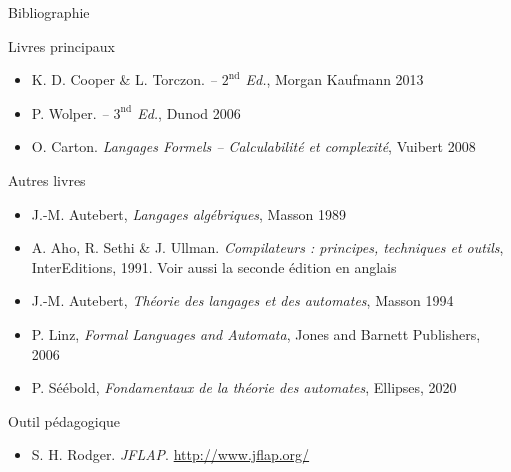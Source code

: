 
\begingroup

\begin{frame}{Bibliographie}
  
  \begin{block}{Livres principaux}\footnotesize
    \begin{itemize}
    \item K. D. Cooper \& L. Torczon. \textit{ -- $2^\text{nd}$ Ed.}, Morgan Kaufmann 2013
    \item P. Wolper. \textit{ -- $3^\text{nd}$ Ed.}, Dunod 2006
    \item O. Carton. \textit{Langages Formels -- Calculabilité et complexité}, Vuibert 2008
    \end{itemize}
  \end{block}

  \begin{block}{Autres livres}\footnotesize
    \begin{itemize}
    \item J.-M. Autebert, \textit{Langages algébriques}, Masson 1989
    \item A. Aho, R. Sethi \& J. Ullman. \textit{Compilateurs : principes, techniques et outils}, InterEditions, 1991. Voir aussi la seconde édition en anglais
    \item J.-M. Autebert, \textit{Théorie des langages et des automates}, Masson 1994
    \item P. Linz, \textit{Formal Languages and Automata}, Jones and Barnett Publishers, 2006
    \item P. Séébold, \textit{Fondamentaux de la théorie des automates}, Ellipses, 2020
    \end{itemize}
  \end{block}

  \begin{block}{Outil pédagogique}\footnotesize
    \begin{itemize}
    \item S. H. Rodger. \textit{JFLAP}. \url{http://www.jflap.org/} 
    \end{itemize}
  \end{block}

\end{frame}

\endgroup
